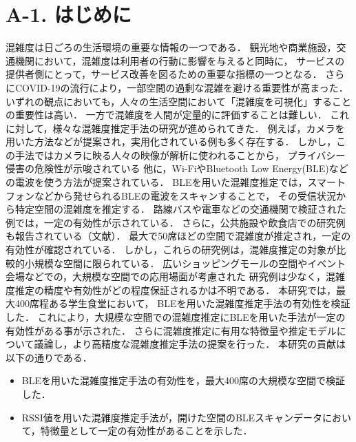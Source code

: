 \section*{A-1. はじめに}
混雑度は日ごろの生活環境の重要な情報の一つである．
観光地や商業施設，交通機関において，混雑度は利用者の行動に影響を与えると同時に，
サービスの提供者側にとって，サービス改善を図るための重要な指標の一つとなる．
さらにCOVID-19の流行により，一部空間の過剰な混雑を避ける重要性が高まった．
いずれの観点においても，人々の生活空間において「混雑度を可視化」することの重要性は高い．
一方で混雑度を人間が定量的に評価することは難しい．
これに対して，様々な混雑度推定手法の研究が進められてきた．
例えば，カメラを用いた方法などが提案され，実用化されている例も多く存在する．
しかし，この手法ではカメラに映る人々の映像が解析に使われることから，
プライバシー侵害の危険性が示唆されている\cite{senkou}
他に，Wi-FiやBluetooth Low Energy(BLE)などの電波を使う方法が提案されている．
BLEを用いた混雑度推定では，スマートフォンなどから発せられるBLEの電波をスキャンすることで，
その受信状況から特定空間の混雑度を推定する．
路線バスや電車などの交通機関で検証された例では，一定の有効性が示されている．
さらに，公共施設や飲食店での研究例も報告されている（文献）．
最大で50席ほどの空間で混雑度が推定され，一定の有効性が確認されている．
しかし，これらの研究例は，混雑度推定の対象が比較的小規模な空間に限られている．
広いショッピングモールの空間やイベント会場などでの，大規模な空間での応用場面が考慮された
研究例は少なく，混雑度推定の精度や有効性がどの程度保証されるかは不明である．
本研究では，最大400席程ある学生食堂において，
BLEを用いた混雑度推定手法の有効性を検証した．
これにより，大規模な空間での混雑度推定にBLEを用いた手法が一定の有効性がある事が示された．
さらに混雑度推定に有用な特徴量や推定モデルについて議論し，より高精度な混雑度推定手法の提案を行った．
本研究の貢献は以下の通りである．
\begin{itemize}
  \item BLEを用いた混雑度推定手法の有効性を，最大400席の大規模な空間で検証した．
  \item RSSI値を用いた混雑度推定手法が，開けた空間のBLEスキャンデータにおいて，特徴量として一定の有効性があることを示した．
\end{itemize}